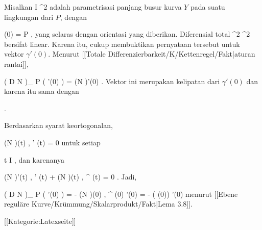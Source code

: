 {

Misalkan
\maabb {\gamma} { I } { \R^2
} {}
adalah parametrisasi panjang busur kurva $Y$ pada suatu lingkungan dari $P$, dengan

\mavergleichskette
{\vergleichskette
{ \gamma (0)
}
{ = }{ P
}
{  }{
}
{    }{
}
{   }{
}
}
{}{}{,}
yang selaras dengan orientasi yang diberikan. Diferensial total
 { \R^2} {\R^2
} {}
bersifat linear. Karena itu, cukup membuktikan pernyataan tersebut untuk vektor $\gamma'(0)$. Menurut
[[Totale Differenzierbarkeit/K/Kettenregel/Fakt|aturan rantai]],

\mavergleichskettedisp
{\vergleichskette
{ \left(  D N   \right)_{ P } \left(   \gamma'(0)  \right)
}
{ =} { (N \circ \gamma )'(0)
}
{ } {
}
{ } {
}
{ } {
}
}
{}{}{.}
Vektor ini merupakan kelipatan dari $\gamma'(0)$ dan karena itu sama dengan

 { . }

Berdasarkan syarat keortogonalan,

\mavergleichskettedisp
{\vergleichskette
{ \left\langle  (N \circ  \gamma)(t) ,  \gamma' (t)   \right\rangle
}
{ =} { 0
}
{ } {
}
{ } {
}
{ } {
}
}
{}{}{}
untuk setiap

\mavergleichskette
{\vergleichskette
{ t
}
{ \in }{ I
}
{  }{
}
{    }{
}
{   }{
}
}
{}{}{},
dan karenanya

\mavergleichskettedisp
{\vergleichskette
{ \left\langle  (N \circ  \gamma)'(t) ,  \gamma' (t)   \right\rangle + \left\langle  (N \circ  \gamma)(t) ,  \gamma^{\prime \prime} (t)   \right\rangle
}
{ =} { 0
}
{ } {
}
{ } {
}
{ } {
}
}
{}{}{.}
Jadi,

\mavergleichskettedisp
{\vergleichskette
{ \left(  D N   \right)_{ P } \left(   \gamma'(0)  \right)
}
{ =} { - \left\langle  (N \circ  \gamma)(0) ,  \gamma^{\prime \prime} (0)   \right\rangle  \gamma'(0)
}
{ =} { - \kappa( \gamma(0)) \gamma'(0)
}
{ } {
}
{ } {
}
}
{}{}{}
menurut
[[Ebene reguläre Kurve/Krümmung/Skalarprodukt/Fakt|Lema 3.8]].

}

 [[Kategorie:Latexseite]]
